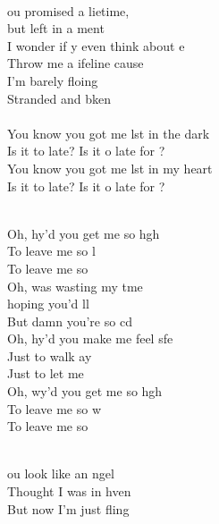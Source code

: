 \begin{cancion}%
	       \\
	ou promised a lietime, \\
	but left in a ment\\
	I wonder if y even think about e\\
	Throw me a ifeline cause \\
	I'm barely floing\\
	Stranded and bken\\
\jump\\
	You know you got me lst in the dark\\
	Is it to late? Is it o late for ?\\
	You know you got me lst in my heart\\
	Is it to late? Is it o late for ?\\\jump\\
	\begin{chorus}%
	Oh, hy'd you get me so hgh\\
	To leave me so l\\
	To leave me so\\
	Oh,  was wasting my tme \\
	hoping you'd ll\\
	But damn you're so cd\\
	Oh, hy'd you make me feel sfe\\
	Just to walk ay\\
	Just to let me \\
	Oh, wy'd you get me so hgh\\
	To leave me so w\\
	To leave me so\\
	\end{chorus}%
	\jump\\
	ou look like an ngel\\
	Thought I was in hven\\
	But now I'm just fling \\

\end{cancion}
